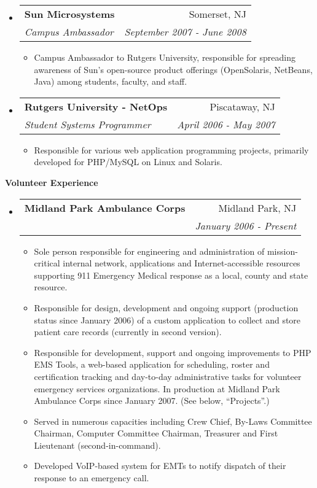 \documentclass[letterpaper,11pt]{article}
\makeatletter
\newcommand{\resitem}[1]{\item #1 \vspace{-2pt}}
\newcommand{\resheading}[1]{{\large \colorbox{mygrey}{\begin{minipage}{\textwidth}{\textbf{#1 \vphantom{p\^{E}}}}\end{minipage}}}}
\newcommand{\ressubheading}[4]{
\begin{tabular*}{7.0in}{l@{\extracolsep{\fill}}r}
		\textbf{#1} & #2 \\
		\textit{#3} & \textit{#4} \\
\end{tabular*}\vspace{-6pt}}
\makeatother
\begin{document}
\begin{itemize}
\item
        \ressubheading{Sun Microsystems}{Somerset, NJ}{Campus Ambassador}{September 2007 - June 2008}
        \begin{itemize}
                \resitem{Campus Ambassador to Rutgers University, responsible for spreading awareness of Sun's open-source product offerings (OpenSolaris, NetBeans, Java) among students, faculty, and staff.}
        \end{itemize}

\item
	\ressubheading{Rutgers University - NetOps}{Piscataway, NJ}{Student Systems Programmer}{April 2006 - May 2007}
	\begin{itemize}
		\resitem{Responsible for various web application programming projects, primarily developed for
                  PHP/MySQL on Linux and Solaris.}
	\end{itemize}

\end{itemize}

\pagebreak

\resheading{Volunteer Experience}
\begin{itemize}
\item
        \ressubheading{Midland Park Ambulance Corps}{Midland Park, NJ}{}{January 2006 - Present}
        \begin{itemize}
                \resitem{Sole person responsible for engineering and administration of
                  mission-critical internal network, applications and
                  Internet-accessible resources supporting 911 Emergency
                  Medical response as a local, county and state resource.}
                \resitem{Responsible for design, development and ongoing support (production
                  status since January 2006) of a custom application to
                  collect and store patient care records (currently in second version).}
                \resitem{Responsible for development, support and ongoing
                  improvements to PHP EMS Tools, a web-based application for
                  scheduling, roster and certification tracking and day-to-day
                administrative tasks for volunteer emergency services
                organizations. In production at Midland Park Ambulance Corps
                since January 2007. (See below, ``Projects''.)}
                \resitem{Served in numerous capacities including Crew Chief,
                  By-Laws Committee Chairman, Computer Committee Chairman,
                  Treasurer and First Lieutenant (second-in-command).}
                \resitem{Developed VoIP-based system for EMTs to notify
                  dispatch of their response to an emergency call.}
        \end{itemize}
\end{itemize}
\end{document}
